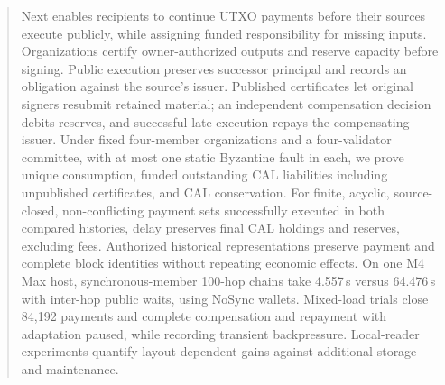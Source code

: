 \begin{abstract}
Next enables recipients to continue UTXO payments before their sources
execute publicly, while assigning funded responsibility for missing
inputs. Organizations certify owner-authorized outputs and reserve
capacity before signing. Public execution preserves successor principal
and records an obligation against the source's issuer. Published
certificates let original signers resubmit retained material; an
independent compensation decision debits reserves, and successful late
execution repays the compensating issuer. Under fixed four-member
organizations and a four-validator committee, with at most one static
Byzantine fault in each, we prove unique consumption, funded outstanding
CAL liabilities including unpublished certificates, and CAL conservation.
For finite, acyclic, source-closed, non-conflicting payment sets
successfully executed in both compared histories, delay preserves final
CAL holdings and reserves, excluding fees. Authorized historical representations preserve payment
and complete block identities without repeating economic effects.
On one M4 Max host, synchronous-member 100-hop chains take 4.557\,s
versus 64.476\,s with inter-hop public waits, using NoSync wallets.
Mixed-load trials close 84,192 payments and complete compensation and
repayment with adaptation paused, while recording transient backpressure.
Local-reader experiments quantify layout-dependent gains against
additional storage and maintenance.
\end{abstract}